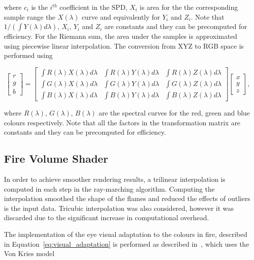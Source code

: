 where $c_i$ is the $i^{th}$ coefficient in the SPD, $X_i$ is area for the the corresponding sample range the $X(\lambda)$ curve and equivalently for $Y_i$ and $Z_i$.
Note that $1 / \left(\int Y(\lambda) d\lambda \right)$, $X_i$, $Y_i$ and $Z_i$ are constants and they can be precomputed for efficiency.
For the Riemann sum, the area under the samples is approximated using piecewise linear interpolation.
The conversion from XYZ to RGB space is performed using

\begin{equation}
\begin{bmatrix}
r \\
g \\
b
\end{bmatrix}
 = 
\begin{bmatrix}
\int R(\lambda) X(\lambda) d\lambda & \int R(\lambda) Y(\lambda) d\lambda & \int R(\lambda) Z(\lambda) d\lambda \\
\int G(\lambda) X(\lambda) d\lambda & \int G(\lambda) Y(\lambda) d\lambda & \int G(\lambda) Z(\lambda) d\lambda \\
\int B(\lambda) X(\lambda) d\lambda & \int B(\lambda) Y(\lambda) d\lambda & \int B(\lambda) Z(\lambda) d\lambda
\end{bmatrix}
\begin{bmatrix}
x \\
y \\
z
\end{bmatrix},
\end{equation}

where $R(\lambda)$, $G(\lambda)$, $B(\lambda)$ are the spectral curves for the red, green and blue colours respectively.
Note that all the factors in the transformation matrix are constants and they can be precomputed for efficiency.

\subsection{Fire Volume Shader}
\label{sec:fire_volume_shader}

In order to achieve smoother rendering results, a trilinear interpolation is computed in each step in the ray-marching algorithm.
Computing the interpolation smoothed the shape of the flames and reduced the effects of outliers is the input data.
Tricubic interpolation was also considered, however it was discarded due to the significant increase in computational overhead.

The implementation of the eye visual adaptation to the colours in fire, described in Equation~\ref{eq:visual_adaptation} is performed as described in~\cite{Nguyen:2002}, which uses the Von Kries model~\cite{Fairchild:2005} 

